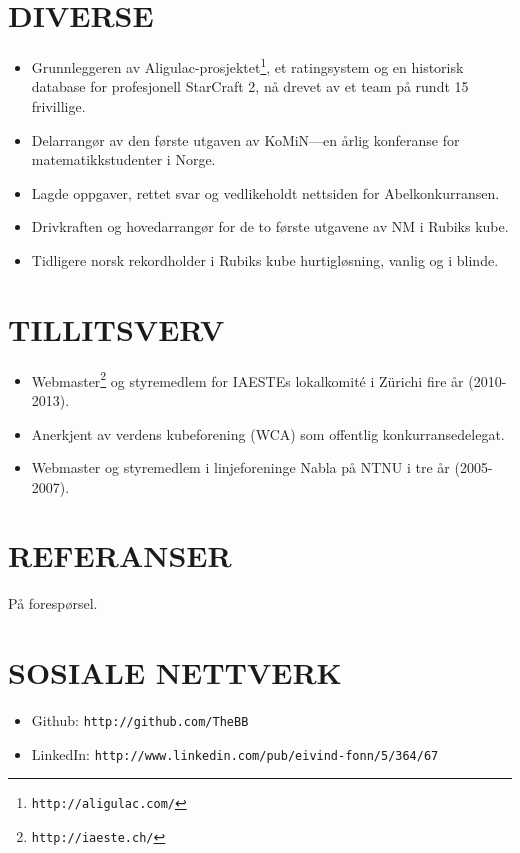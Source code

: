 \documentclass[line,margin]{res}
\newcommand{\zh}{Z\"{u}rich}
\begin{document}
\begin{resume}
\section{DIVERSE}

\begin{itemize}
\item Grunnleggeren av Aligulac-prosjektet\footnote{{\tt http://aligulac.com/}}, et ratingsystem og
  en historisk database for profesjonell StarCraft 2, nå drevet av et team på rundt 15 frivillige.
\item Delarrangør av den første utgaven av KoMiN---en årlig konferanse for matematikkstudenter i
  Norge.
\item Lagde oppgaver, rettet svar og vedlikeholdt nettsiden for Abelkonkurransen.
\item Drivkraften og hovedarrangør for de to første utgavene av NM i Rubiks kube.
\item Tidligere norsk rekordholder i Rubiks kube hurtigløsning, vanlig og i blinde.
\end{itemize}


\section{TILLITSVERV}

\begin{itemize}
\item Webmaster\footnote{{\tt http://iaeste.ch/}} og styremedlem for IAESTEs lokalkomité i \zh i
  fire år (2010-2013).
\item Anerkjent av verdens kubeforening (WCA) som offentlig konkurransedelegat.
\item Webmaster og styremedlem i linjeforeninge Nabla på NTNU i tre år (2005-2007).
\end{itemize}


\section{REFERANSER}

På forespørsel.



\section{SOSIALE NETTVERK}

\begin{itemize}
\item Github: \texttt{http://github.com/TheBB}
\item LinkedIn: \texttt{http://www.linkedin.com/pub/eivind-fonn/5/364/67}
\end{itemize}


\end{resume}
\end{document}
